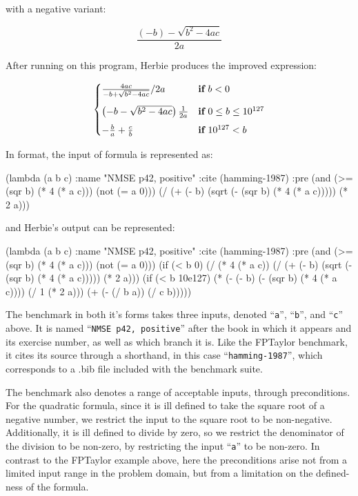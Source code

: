 \documentclass[main.tex]{subfiles}
\begin{document}
with a negative variant:

\begin{equation}
  \frac{(- b) - \sqrt{b^2 - 4ac}}{2a}
\end{equation}

After running on this program, Herbie produces the improved
expression:

\newcommand{\K}[1]{\ensuremath{\mathbf{#1}}\relax\ifmmode\:\else\fi}

\[
\begin{cases}
  \frac{4ac}{-b + \sqrt{b^2 - 4ac}}/2a & \K{if} b < 0 \\[9pt]
  \left(-b - \sqrt{b^2 - 4ac}\right)\frac1{2a} & \K{if} 0 \le b \le 10^{127} \\[5pt]
  -\frac{b}{a} + \frac{c}{b} & \K{if} 10^{127} < b
\end{cases}
\]

In \core format, the input of formula is represented as:

\begin{code}
(lambda (a b c)
  :name "NMSE p42, positive"
  :cite (hamming-1987)
  :pre (and (>= (sqr b) (* 4 (* a c))) (not (= a 0)))
  (/ (+ (- b) (sqrt (- (sqr b) (* 4 (* a c))))) (* 2 a)))
\end{code}

and Herbie's output can be represented:

\begin{code}
(lambda (a b c)
  :name "NMSE p42, positive"
  :cite (hamming-1987)
  :pre (and (>= (sqr b) (* 4 (* a c))) (not (= a 0)))
  (if (< b 0)
      (/ (* 4 (* a c))
         (/ (+ (- b) (sqrt (- (sqr b) (* 4 (* a c)))))
            (* 2 a)))
      (if (< b 10e127)
          (* (- (- b) (- (sqr b) (* 4 (* a c)))) (/ 1 (* 2 a)))
          (+ (- (/ b a)) (/ c b)))))
\end{code}

The benchmark in both it's forms takes three inputs, denoted
``\verb|a|'', ``\verb|b|'', and ``\verb|c|'' above. It is named
``\verb|NMSE p42, positive|'' after the book in which it appears and
its exercise number, as well as which branch it is. Like the FPTaylor
benchmark, it cites its source through a shorthand, in this case
``\verb|hamming-1987|'', which corresponds to a .bib file included
with the benchmark suite.

The benchmark also denotes a range of acceptable inputs, through
preconditions. For the quadratic formula, since it is ill defined to
take the square root of a negative number, we restrict the input to
the square root to be non-negative. Additionally, it is ill defined to
divide by zero, so we restrict the denominator of the division to be
non-zero, by restricting the input ``\verb|a|'' to be non-zero. In
contrast to the FPTaylor example above, here the preconditions arise
not from a limited input range in the problem domain, but from a
limitation on the defined-ness of the formula.
\end{document}
